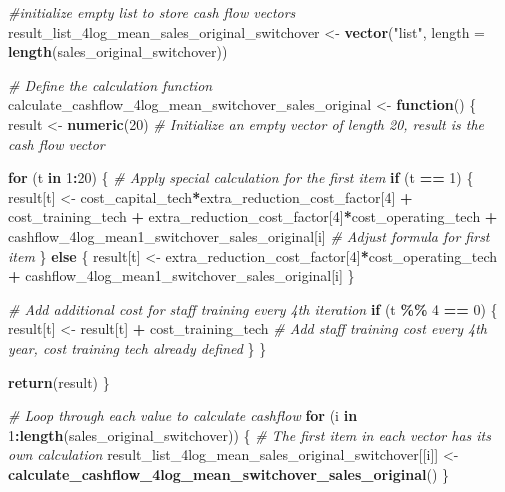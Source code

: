 \documentclass[
]{article}
\newenvironment{Shaded}{\begin{snugshade}}{\end{snugshade}}
\newcommand{\AttributeTok}[1]{\textcolor[rgb]{0.13,0.29,0.53}{#1}}
\newcommand{\CommentTok}[1]{\textcolor[rgb]{0.56,0.35,0.01}{\textit{#1}}}
\newcommand{\ControlFlowTok}[1]{\textcolor[rgb]{0.13,0.29,0.53}{\textbf{#1}}}
\newcommand{\DecValTok}[1]{\textcolor[rgb]{0.00,0.00,0.81}{#1}}
\newcommand{\FunctionTok}[1]{\textcolor[rgb]{0.13,0.29,0.53}{\textbf{#1}}}
\newcommand{\NormalTok}[1]{#1}
\newcommand{\OtherTok}[1]{\textcolor[rgb]{0.56,0.35,0.01}{#1}}
\newcommand{\SpecialCharTok}[1]{\textcolor[rgb]{0.81,0.36,0.00}{\textbf{#1}}}
\newcommand{\StringTok}[1]{\textcolor[rgb]{0.31,0.60,0.02}{#1}}
\begin{document}
\begin{Shaded}
\begin{Highlighting}[]
\CommentTok{\#initialize empty list to store cash flow vectors}
\NormalTok{result\_list\_4log\_mean\_sales\_original\_switchover }\OtherTok{\textless{}{-}} \FunctionTok{vector}\NormalTok{(}\StringTok{"list"}\NormalTok{, }\AttributeTok{length =} \FunctionTok{length}\NormalTok{(sales\_original\_switchover))}


\CommentTok{\# Define the calculation function}
\NormalTok{calculate\_cashflow\_4log\_mean\_switchover\_sales\_original }\OtherTok{\textless{}{-}} \ControlFlowTok{function}\NormalTok{() \{}
\NormalTok{  result }\OtherTok{\textless{}{-}} \FunctionTok{numeric}\NormalTok{(}\DecValTok{20}\NormalTok{)  }\CommentTok{\# Initialize an empty vector of length 20, result is the cash flow vector}
  
  \ControlFlowTok{for}\NormalTok{ (t }\ControlFlowTok{in} \DecValTok{1}\SpecialCharTok{:}\DecValTok{20}\NormalTok{) \{}
    \CommentTok{\# Apply special calculation for the first item}
    \ControlFlowTok{if}\NormalTok{ (t }\SpecialCharTok{==} \DecValTok{1}\NormalTok{) \{}
\NormalTok{      result[t] }\OtherTok{\textless{}{-}}\NormalTok{ cost\_capital\_tech}\SpecialCharTok{*}\NormalTok{extra\_reduction\_cost\_factor[}\DecValTok{4}\NormalTok{] }\SpecialCharTok{+}\NormalTok{ cost\_training\_tech }\SpecialCharTok{+}\NormalTok{ extra\_reduction\_cost\_factor[}\DecValTok{4}\NormalTok{]}\SpecialCharTok{*}\NormalTok{cost\_operating\_tech }\SpecialCharTok{+}\NormalTok{ cashflow\_4log\_mean1\_switchover\_sales\_original[i] }\CommentTok{\# Adjust formula for first item}
\NormalTok{    \} }\ControlFlowTok{else}\NormalTok{ \{}
\NormalTok{      result[t] }\OtherTok{\textless{}{-}}\NormalTok{ extra\_reduction\_cost\_factor[}\DecValTok{4}\NormalTok{]}\SpecialCharTok{*}\NormalTok{cost\_operating\_tech }\SpecialCharTok{+}\NormalTok{ cashflow\_4log\_mean1\_switchover\_sales\_original[i]}
\NormalTok{    \}}
    
    \CommentTok{\# Add additional cost for staff training every 4th iteration}
    \ControlFlowTok{if}\NormalTok{ (t }\SpecialCharTok{\%\%} \DecValTok{4} \SpecialCharTok{==} \DecValTok{0}\NormalTok{) \{}
\NormalTok{      result[t] }\OtherTok{\textless{}{-}}\NormalTok{ result[t] }\SpecialCharTok{+}\NormalTok{ cost\_training\_tech  }\CommentTok{\# Add staff training cost every 4th year, cost training tech already defined}
\NormalTok{    \}}
\NormalTok{  \}}
  
  \FunctionTok{return}\NormalTok{(result)}
\NormalTok{\}}

\CommentTok{\# Loop through each value to calculate cashflow}
\ControlFlowTok{for}\NormalTok{ (i }\ControlFlowTok{in} \DecValTok{1}\SpecialCharTok{:}\FunctionTok{length}\NormalTok{(sales\_original\_switchover)) \{}
  \CommentTok{\# The first item in each vector has its own calculation}
\NormalTok{  result\_list\_4log\_mean\_sales\_original\_switchover[[i]] }\OtherTok{\textless{}{-}} \FunctionTok{calculate\_cashflow\_4log\_mean\_switchover\_sales\_original}\NormalTok{()}
\NormalTok{\}}


\end{Highlighting}
\end{Shaded}
\end{document}
